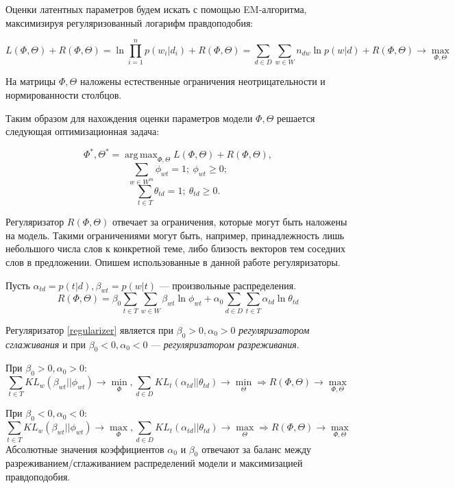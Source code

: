 \documentclass[pdftex,ptm,12pt,a4paper]{report}
\theoremstyle{definition}
\DeclareMathOperator*{\argmax}{arg\,max}
\begin{document}
Оценки латентных параметров будем искать с помощью EM-алгоритма, максимизируя регуляризованный \cite{Vorontsov2015} логарифм правдоподобия:

\[ L(\Phi, \Theta) + R(\Phi, \Theta) = \ln \prod_{i = 1}^{n}p(w_i|d_i) + R(\Phi, \Theta) = \sum_{d\in D}\sum_{w\in W}n_{dw}\ln p(w|d) + R(\Phi, \Theta) \rightarrow  \max_{\Phi, \Theta} \]

На матрицы $\Phi, \Theta$ наложены естественные ограничения неотрицательности и нормированности столбцов.

Таким образом для нахождения оценки параметров модели $\Phi, \Theta$ решается следующая оптимизационная задача:

\[\Phi^{*}, \Theta^{*} = \argmax_{\Phi, \Theta} L(\Phi, \Theta ) + R(\Phi, \Theta) ,\]
\[
\sum_{w\in W^{m}} \phi_{wt} = 1;~ \phi_{wt} \geq 0; 
\]
\[
\sum_{t\in T} \theta_{td} = 1;~ \theta_{td} \geq 0. 
\]

Регуляризатор $R(\Phi, \Theta)$ отвечает за ограничения, которые могут быть наложены на модель. Такими ограничениями могут быть, например, принадлежность лишь небольшого числа слов к конкретной теме, либо близость векторов тем соседних слов в предложении. Опишем использованные в данной работе регуляризаторы.

Пусть $\alpha_{td} = p(t|d), \beta_{wt} = p(w|t)$ --- произвольные распределения.
\begin{equation}\label{regularizer}
R(\Phi, \Theta) = \beta_0\sum_{t \in T}\sum_{w\in W}\beta_{wt}\ln\phi_{wt} + \alpha_0\sum_{d \in D}\sum_{t\in T}\alpha_{td}\ln\theta_{td}
\end{equation}

Регуляризатор \ref{regularizer} является при $\beta_0 > 0, \alpha_0 > 0$ \textit{регуляризатором сглаживания} и при $\beta_0 < 0, \alpha_0 < 0$ ---  
\textit{регуляризатором разреживания}. 

При $\beta_0 > 0, \alpha_0 > 0$: 
\[ \sum_{t\in T}KL_w(\beta_{wt}||\phi_{wt}) \rightarrow \min_{\Phi},
\sum_{d\in D}KL_t(\alpha_{td}||\theta_{td}) \rightarrow \min_{\Theta} \Longrightarrow  R(\Phi, \Theta) \rightarrow \max_{\Phi, \Theta}\]


При $\beta_0 < 0, \alpha_0 < 0$: 
\[ \sum_{t\in T}KL_w(\beta_{wt}||\phi_{wt}) \rightarrow \max_{\Phi},
\sum_{d\in D}KL_t(\alpha_{td}||\theta_{td}) \rightarrow \max_{\Theta} \Longrightarrow  R(\Phi, \Theta) \rightarrow \max_{\Phi, \Theta}\]
   Абсолютные значения коэффициентов $\alpha_0$ и $\beta_0$ отвечают за баланс между разреживанием/сглаживанием распределений модели и максимизацией правдоподобия.
\end{document}

